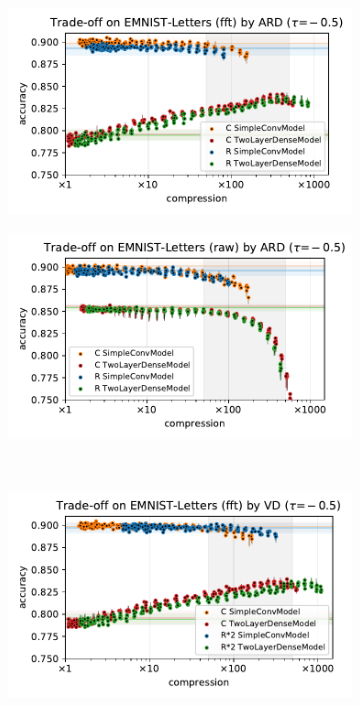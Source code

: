 \documentclass[a4paper,10pt,onecolumn]{article}
\begin{document}
\begin{figure}[b]
\begin{subfigure}[b]{0.5\columnwidth}
  \end{subfigure} \\ %
  \begin{subfigure}[b]{0.5\columnwidth}
    \centering
    \includegraphics[width=\columnwidth]{figure__mnist-like__trade-off/appendix__ARD__emnist_letters__fft__-0.5.pdf}
  \end{subfigure}%
  \begin{subfigure}[b]{0.5\columnwidth}
    \centering
    \includegraphics[width=\columnwidth]{figure__mnist-like__trade-off/appendix__ARD__emnist_letters__raw__-0.5.pdf}
  \end{subfigure} \\ %
  \begin{subfigure}[b]{0.5\columnwidth}
    \centering
    \includegraphics[width=\columnwidth]{figure__mnist-like__trade-off/appendix__cmp__VD__emnist_letters__fft__-0.5.pdf}

\end{subfigure}
\end{figure}
\end{document}
